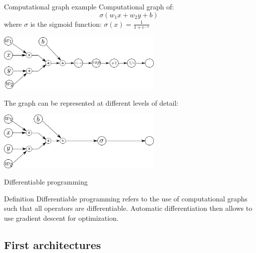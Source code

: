 \documentclass[xcolor=pdftex,dvipsnames,table,mathserif]{beamer}
\begin{document}
\begin{frame}{Computational graph example}
  Computational graph of:
  \[
  \sigma(w_1x + w_2y + b)
  \]
  where $\sigma$ is the sigmoid function: $\sigma(x) = \frac{1}{1 + e^{-x}}$

  \pause

  \centering
  \begin{block}{}
    \centering
   \includegraphics[width=0.6\textwidth]{comp_graph2}\\
   \end{block}

  \pause

  The graph can be represented at different levels of detail:
 \begin{block}{}
    \centering
  \includegraphics[width=0.6\textwidth]{comp_graph}
   \end{block}

\end{frame}

\begin{frame}{Differentiable programming}

  \begin{block}{Definition}
    Differentiable programming refers to the use of computational graphs such that all operators are differentiable. Automatic differentiation then allows to use gradient descent for optimization.
  \end{block}

\end{frame}

\subsection{First architectures}
\end{document}
